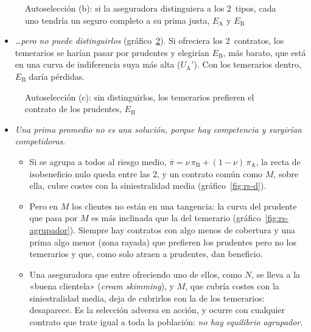 \documentclass[11pt]{article}
\begin{document}
\begin{figure}[H]
\centering
\caption{Autoselección (b): si la aseguradora distinguiera a los 2~tipos, cada uno tendría un seguro completo a su prima justa, $E_{\mathrm{A}}$ y $E_{\mathrm{B}}$}\label{fig:rs-b}
\end{figure}

\begin{itemize}
\item \emph{\ldots pero no puede distinguirlos} (gráfico~\ref{fig:rs-c}). Si ofreciera los 2~contratos, los temerarios se harían pasar por prudentes y elegirían $E_{\mathrm{B}}$, más barato, que está en una curva de indiferencia suya más alta ($U_{\mathrm{A}}'$). Con los temerarios dentro, $E_{\mathrm{B}}$ daría pérdidas.
\end{itemize}

\begin{figure}[H]
\centering
\caption{Autoselección (c): sin distinguirlos, los temerarios prefieren el contrato de los prudentes, $E_{\mathrm{B}}$}\label{fig:rs-c}
\end{figure}

\begin{itemize}
\item \emph{Una prima promedio no es una solución, porque hay competencia y surgirían competidoras}.
  \begin{itemize}
  \item Si se agrupa a todos al riesgo medio, $\overline{\pi}=\nu\,\pi_{\mathrm{B}}+(1-\nu)\,\pi_{\mathrm{A}}$, la recta de isobeneficio nulo queda entre las 2, y un contrato común como $M$, sobre ella, cubre costes con la siniestralidad media (gráfico~\ref{fig:rs-d}).
  \item Pero en $M$ los clientes no están en una tangencia: la curva del prudente que pasa por $M$ es más inclinada que la del temerario (gráfico~\ref{fig:rs-agrupador}). Siempre hay contratos con algo menos de cobertura y una prima algo menor (zona rayada) que prefieren los prudentes pero no los temerarios y que, como solo atraen a prudentes, dan beneficio.
  \item Una aseguradora que entre ofreciendo uno de ellos, como $N$, se lleva a la «buena clientela» (\emph{cream skimming}), y $M$, que cubría costes con la siniestralidad media, deja de cubrirlos con la de los temerarios: desaparece. Es la selección adversa en acción, y ocurre con cualquier contrato que trate igual a toda la población: \emph{no hay equilibrio agrupador}.
  \end{itemize}
\end{itemize}
\end{document}
